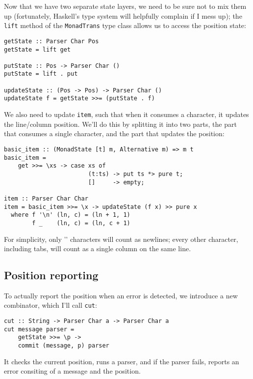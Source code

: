 \documentclass{tmr}
\begin{document}
Now that we have two separate state layers, we need to be sure not to mix them 
up (fortunately, Haskell's type system will helpfully complain if I mess up);
the \verb+lift+ method of the \verb+MonadTrans+ type class allows us to access
the position state:
\begin{verbatim}
getState :: Parser Char Pos
getState = lift get

putState :: Pos -> Parser Char ()
putState = lift . put

updateState :: (Pos -> Pos) -> Parser Char ()
updateState f = getState >>= (putState . f)
\end{verbatim}

We also need to update \verb+item+, such that when it consumes a character, 
it updates the line/column position.  We'll do this by splitting it into two
parts, the part that consumes a single character, and the part that updates the
position:
\begin{verbatim}
basic_item :: (MonadState [t] m, Alternative m) => m t
basic_item =
    get >>= \xs -> case xs of
                        (t:ts) -> put ts *> pure t;
                        []     -> empty;

item :: Parser Char Char
item = basic_item >>= \x -> updateState (f x) >> pure x
  where f '\n' (ln, c) = (ln + 1, 1)
        f _    (ln, c) = (ln, c + 1)
\end{verbatim}

For simplicity, only '\n' characters will count as newlines; every other character,
including tabs, will count as a single column on the same line.


\subsection{Position reporting}
To actually report the position when an error is detected, we introduce a new 
combinator, which I'll call \verb+cut+:
\begin{verbatim}
cut :: String -> Parser Char a -> Parser Char a
cut message parser = 
    getState >>= \p ->
    commit (message, p) parser
\end{verbatim}

It checks the current position, runs a parser, and if the parser fails, reports
an error consiting of a message and the position.
\end{document}
